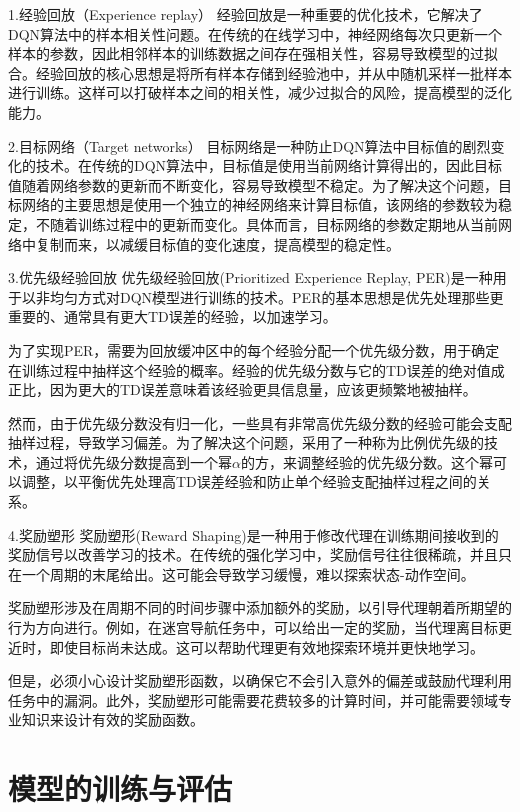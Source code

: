 1.经验回放（Experience replay）
经验回放是一种重要的优化技术，它解决了DQN算法中的样本相关性问题。在传统的在线学习中，神经网络每次只更新一个样本的参数，因此相邻样本的训练数据之间存在强相关性，容易导致模型的过拟合。经验回放的核心思想是将所有样本存储到经验池中，并从中随机采样一批样本进行训练。这样可以打破样本之间的相关性，减少过拟合的风险，提高模型的泛化能力。

2.目标网络（Target networks）
目标网络是一种防止DQN算法中目标值的剧烈变化的技术。在传统的DQN算法中，目标值是使用当前网络计算得出的，因此目标值随着网络参数的更新而不断变化，容易导致模型不稳定。为了解决这个问题，目标网络的主要思想是使用一个独立的神经网络来计算目标值，该网络的参数较为稳定，不随着训练过程中的更新而变化。具体而言，目标网络的参数定期地从当前网络中复制而来，以减缓目标值的变化速度，提高模型的稳定性。

3.优先级经验回放
优先级经验回放(Prioritized Experience Replay, PER)是一种用于以非均匀方式对DQN模型进行训练的技术。PER的基本思想是优先处理那些更重要的、通常具有更大TD误差的经验，以加速学习。

为了实现PER，需要为回放缓冲区中的每个经验分配一个优先级分数，用于确定在训练过程中抽样这个经验的概率。经验的优先级分数与它的TD误差的绝对值成正比，因为更大的TD误差意味着该经验更具信息量，应该更频繁地被抽样。

然而，由于优先级分数没有归一化，一些具有非常高优先级分数的经验可能会支配抽样过程，导致学习偏差。为了解决这个问题，采用了一种称为比例优先级的技术，通过将优先级分数提高到一个幂$\alpha$的方，来调整经验的优先级分数。这个幂可以调整，以平衡优先处理高TD误差经验和防止单个经验支配抽样过程之间的关系。

4.奖励塑形
奖励塑形(Reward Shaping)是一种用于修改代理在训练期间接收到的奖励信号以改善学习的技术。在传统的强化学习中，奖励信号往往很稀疏，并且只在一个周期的末尾给出。这可能会导致学习缓慢，难以探索状态-动作空间。

奖励塑形涉及在周期不同的时间步骤中添加额外的奖励，以引导代理朝着所期望的行为方向进行。例如，在迷宫导航任务中，可以给出一定的奖励，当代理离目标更近时，即使目标尚未达成。这可以帮助代理更有效地探索环境并更快地学习。

但是，必须小心设计奖励塑形函数，以确保它不会引入意外的偏差或鼓励代理利用任务中的漏洞。此外，奖励塑形可能需要花费较多的计算时间，并可能需要领域专业知识来设计有效的奖励函数。

\section{模型的训练与评估}

